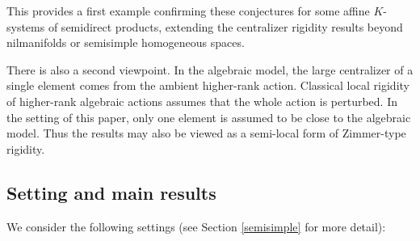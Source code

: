 \documentclass[11pt]{amsart}
\numberwithin{equation}{section}
\theoremstyle{plain}
\begin{document}
This provides a first example confirming these conjectures for some affine $K$-systems of semidirect products, extending the centralizer rigidity results beyond nilmanifolds or semisimple homogeneous spaces. 

There is also a second viewpoint.  In the algebraic model, the large
centralizer of a single element comes from the ambient higher-rank action.  Classical local rigidity
of higher-rank algebraic actions assumes that the whole action is perturbed.
In the setting of this paper, only one element is assumed to be close to the
algebraic model. Thus the results may also be viewed as a
semi-local form of Zimmer-type rigidity. 

\subsection{Setting and main results}

We consider the following settings (see Section \ref{semisimple} for more detail):
\end{document}
